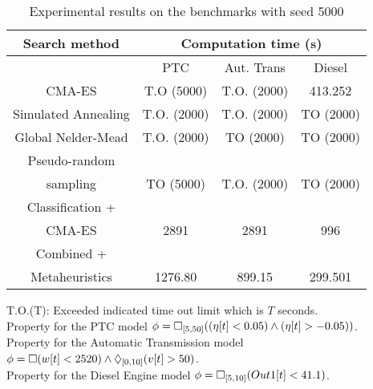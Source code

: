 \begin{table}[ht]
\caption{Experimental results on the benchmarks with seed 5000}
\label{tab:results}
\begin{center}
\begin{tabular}{|c|c|c|c|}
\hline
\multirow{1}{*}{Search method} & \multicolumn{3}{|c|}{Computation time (s)} \\
\hline
\cline{2-4}
 &  PTC & Aut. Trans & Diesel    \\
\hline
\cline{2-4}
 CMA-ES & T.O (5000)  & T.O. (2000)  &  413.252  \\
\hline
\cline{2-4}
 Simulated Annealing &  T.O. (2000) & T.O. (2000)  & TO (2000)     \\
\hline
\cline{2-4}
Global Nelder-Mead &  T.O. (2000) &  TO (2000)  &  TO (2000)    \\
\hline
\cline{2-4}
Pseudo-random & & & \\ 
sampling &  TO (5000)  &  T.O. (2000) & TO (2000)    \\
\hline
\cline{2-4}
Classification + & & & \\ 
CMA-ES  \cite{CAV2017} & 2891  & 2891  & 996    \\
\hline
\cline{2-4}
 Combined + & & & \\ 
 Metaheuristics & 1276.80 &  899.15 & 299.501   \\
\hline
\end{tabular}
\end{center}
{\small T.O.(T): Exceeded indicated time out limit which is $T$ seconds.\\
Property for the PTC model $\phi = \Box_{[5,50]}( (\eta[t] < 0.05) \land ( \eta[t] > - 0.05 ))$. \\
Property for the Automatic Transmission model $\phi =  \Box(w[t] < 2520) \land  \Diamond_{[0,10]}(v[t] > 50)$. \\
Property for the Diesel Engine model   $\phi = \Box_{[5,10]} (Out1[t] < 41.1)$. 
}
\end{table}


